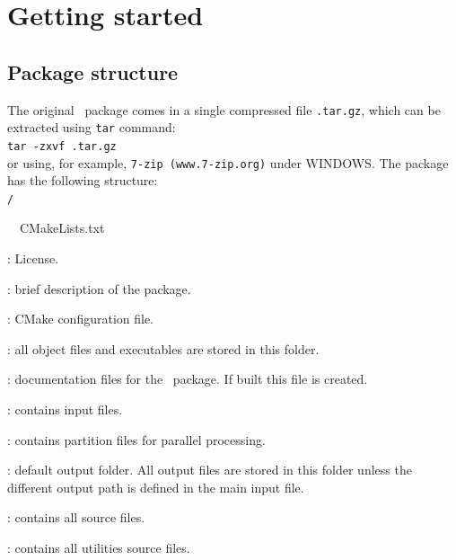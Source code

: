 \chapter{Getting started}
\section{Package structure}
The original \pack\ package comes in a single compressed file \linebreak\texttt{\pack.tar.gz}, which can be extracted using \texttt{tar} command:\\

\texttt{tar -zxvf \pack.tar.gz}\\

or using, for example, \texttt{7-zip (www.7-zip.org)} under WINDOWS. The package has the following structure:\\



\texttt{\pack/}
\begin{adescription}{~~CMakeLists.txt}
\item[~~COPYING]               : License.
\item[~~README]                : brief description of the package.
\item[~~CMakeLists.txt]        : CMake configuration file.
\item[~~bin/]                  : all object files and executables are stored in this folder.
\item[~~doc/]                  : documentation files for the \pack\ package. If built this file is created.
\item[~~input/]                : contains input files.
\item[~~partition/]            : contains partition files for parallel processing.
\item[~~output/]               : default output folder. All output files are stored in this folder unless the different output path is defined in the main input file.
\item[~~src/]                  : contains all source files.
\item[~~util/]                  : contains all utilities source files.
\end{adescription}

